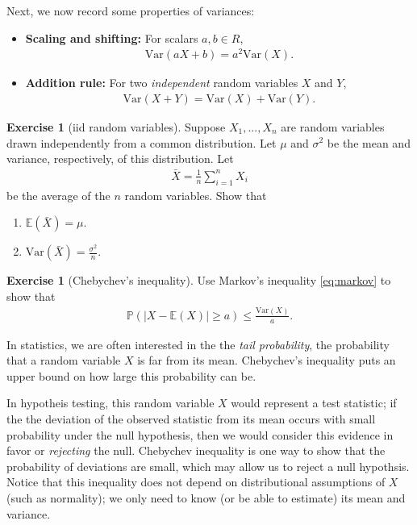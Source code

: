 \documentclass[11pt]{article}
\theoremstyle{definition}
\newtheorem{exercise}[]{Exercise}
\renewcommand{\P}{\mathbb{P}}
\newcommand{\E}{\mathbb{E}}
\newcommand{\V}{\text{Var}}
\begin{document}
Next, we now record some properties of variances:
\begin{itemize}
  \item {\bf Scaling and shifting: } For scalars $a, b\in R$,
  \begin{align*}
    \V(aX + b) = a^2\V(X).
  \end{align*}
  \item {\bf Addition rule: } For two \textit{independent}
  random variables $X$ and $Y$,
  \begin{align*}
    \V(X + Y) = \V(X) + \V(Y).
  \end{align*}
\end{itemize}

\begin{exercise}[iid random variables]
  Suppose $X_1,..., X_n$ are random variables drawn independently from a
  common distribution. Let $\mu$ and $\sigma^2$ be the mean and variance,
  respectively, of this distribution. Let
  \begin{align*}
    \bar{X} = \frac{1}{n} \sum_{i=1}^n X_i
  \end{align*}
  be the average of the $n$ random variables. Show that

  \begin{enumerate}[label = (\alph*)]
    \item $\E(\bar{X}) = \mu$.
    \item $\V(\bar{X}) = \frac{\sigma^2}{n}$.
  \end{enumerate}
\end{exercise}

\begin{exercise}[Chebychev's inequality]
  Use Markov's inequality \eqref{eq:markov} to show that
  \begin{align*}
    \P(|X - \E(X)| \geq a) \leq \frac{\V(X)}{a}.
  \end{align*}
\end{exercise}

In statistics, we are often interested in the the \textit{tail probability},
the probability that a random variable $X$ is far from its mean.
Chebychev's inequality puts an upper bound on how large this probability can be.

In hypotheis testing, this random variable $X$ would represent a test statistic;
if the the deviation of the observed statistic from its mean occurs with small probability under
the null hypothesis,
then we would consider this evidence in favor or \textit{rejecting} the null.
Chebychev inequality is one way to show that the probability of deviations are small,
which may allow us to reject a null hypothsis.
Notice that this inequality does not depend on distributional assumptions of $X$
(such as normality); we only need to know (or be able to estimate) its mean and variance.
\end{document}
